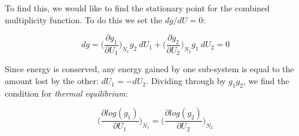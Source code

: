 To find this, we would like to find the stationary point for the combined multiplicity function. To do this we set the $dg/dU = 0$:

\begin{equation}
dg = \bigg(\frac{\partial g_1}{\partial U_1}\bigg)_{N_1} g_2~dU_1 +
     \bigg(\frac{\partial g_2}{\partial U_2}\bigg)_{N_2} g_1~dU_2 = 0  
\label{eq:maxg}
\end{equation}

Since energy is conserved, any energy gained by one sub-system is equal
to the amount lost by the other: $dU_1 = -dU_2$. Dividing through by
$g_1 g_2$, we find the condition for \textit{thermal equilibrium}:

\begin{equation}
\bigg(\frac{\partial log(g_1)}{\partial U_1}\bigg)_{N_1} = 
\bigg(\frac{\partial log(g_2)}{\partial U_2}\bigg)_{N_2}
\label{eq:maxmicro}
\end{equation}

